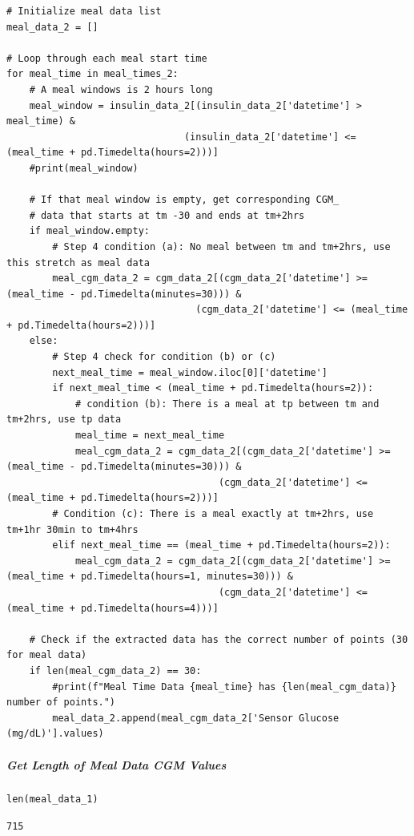 \begin{verbatim}
# Initialize meal data list
meal_data_2 = []

# Loop through each meal start time
for meal_time in meal_times_2:
    # A meal windows is 2 hours long
    meal_window = insulin_data_2[(insulin_data_2['datetime'] > meal_time) & 
                               (insulin_data_2['datetime'] <= (meal_time + pd.Timedelta(hours=2)))]
    #print(meal_window)

    # If that meal window is empty, get corresponding CGM_
    # data that starts at tm -30 and ends at tm+2hrs
    if meal_window.empty:
        # Step 4 condition (a): No meal between tm and tm+2hrs, use this stretch as meal data
        meal_cgm_data_2 = cgm_data_2[(cgm_data_2['datetime'] >= (meal_time - pd.Timedelta(minutes=30))) & 
                                 (cgm_data_2['datetime'] <= (meal_time + pd.Timedelta(hours=2)))]
    else:
        # Step 4 check for condition (b) or (c)
        next_meal_time = meal_window.iloc[0]['datetime']
        if next_meal_time < (meal_time + pd.Timedelta(hours=2)):
            # condition (b): There is a meal at tp between tm and tm+2hrs, use tp data
            meal_time = next_meal_time
            meal_cgm_data_2 = cgm_data_2[(cgm_data_2['datetime'] >= (meal_time - pd.Timedelta(minutes=30))) & 
                                     (cgm_data_2['datetime'] <= (meal_time + pd.Timedelta(hours=2)))]
        # Condition (c): There is a meal exactly at tm+2hrs, use tm+1hr 30min to tm+4hrs
        elif next_meal_time == (meal_time + pd.Timedelta(hours=2)):
            meal_cgm_data_2 = cgm_data_2[(cgm_data_2['datetime'] >= (meal_time + pd.Timedelta(hours=1, minutes=30))) & 
                                     (cgm_data_2['datetime'] <= (meal_time + pd.Timedelta(hours=4)))]

    # Check if the extracted data has the correct number of points (30 for meal data)
    if len(meal_cgm_data_2) == 30:
        #print(f"Meal Time Data {meal_time} has {len(meal_cgm_data)} number of points.")
        meal_data_2.append(meal_cgm_data_2['Sensor Glucose (mg/dL)'].values)
\end{verbatim}

\subparagraph{Get Length of Meal Data CGM Values}

\begin{verbatim}
len(meal_data_1)
\end{verbatim}

\begin{verbatim}
715
\end{verbatim}

